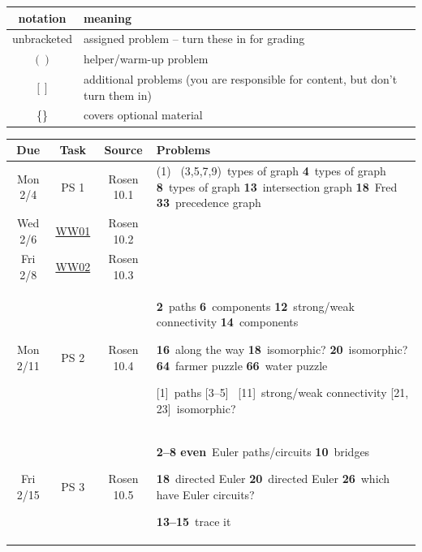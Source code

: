 \documentclass{scrartcl}
\def\WW#1{\href{https://mathwebwork.cs.calvin.edu/webwork2/Math252-S19-Pruim/WW#1}{WW#1}}
\def\hwn#1{\relax}
\def\hwn#1{\ {\tiny (#1)}}
\def\hwn#1{$_{\mbox{\ \tiny #1}}$}
\def\hwn#1{~{\tiny #1}}
\newcommand{\helper}[2][\relax]{(#2)\hwn{#1}}
\newcommand{\extra}[2][\relax]{[#2]\hwn{#1}}
\newcommand{\mand}[2][\relax]{{\bf \large #2}\hwn{#1}}
\begin{document}
\begin{center}

\iftrue

\begin{longtable}{|c|l|}
  \hline
  notation & meaning \\
  \hline
  unbracketed & assigned problem -- turn these in for grading \\
  $()$ & helper/warm-up problem  \\
  $[]$ & additional problems (you are responsible for content, but don't turn them in) \\
  \{\} & covers optional material \\
  \hline
\end{longtable}
\fi

\bigskip


\begin{longtable}{|c|c|c|p{4.3in}|}
  \hline
  Due & Task & Source & Problems \\
  \hline\hline
  \endhead
  	 Mon 2/4 & PS 1 & Rosen 10.1 &
	 \helper{1}
	 \helper[types of graph]{3,5,7,9}
	 \mand[types of graph]{4}
	 \mand[types of graph]{8}
	 \mand[intersection graph]{13}
	 \mand[Fred]{18}
	 \mand[precedence graph]{33}
	 \\
	 \hline
	 Wed 2/6 & \WW{01} & Rosen 10.2 &
	 \\
	 \hline
	 Fri 2/8 & \WW{02} & Rosen 10.3 &
	 \\
	 \hline
	 Mon 2/11 & PS 2 & Rosen 10.4 &
	 \mand[paths]{2}
	 \mand[components]{6}
	 \mand[strong/weak connectivity]{12}
	 \mand[components]{14}

   \mand[along the way]{16}
	 \mand[isomorphic?]{18}
	 \mand[isomorphic?]{20}
	 \mand[farmer puzzle]{64}
	 \mand[water puzzle]{66}

	 \extra[paths]{1}
	 \extra{3--5}
	 \extra[strong/weak connectivity]{11}
	 \extra[isomorphic?]{21, 23}
	 \\
	 \hline
	 Fri 2/15 & PS 3 & Rosen 10.5 &
	 \mand[Euler paths/circuits]{2--8 even}
	 \mand[bridges]{10}

	 \mand[directed Euler]{18}
	 \mand[directed Euler]{20}
	 \mand[which have Euler circuits?]{26}

	 \mand[trace it]{13--15}


\end{longtable}
\end{center}
\end{document}

